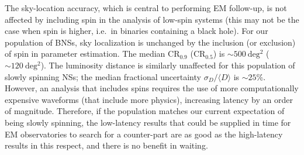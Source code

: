 The sky-location accuracy, which is central to performing EM follow-up, is not affected by including spin in the analysis of low-spin systems (this may not be the case when spin is higher, i.e.\ in binaries containing a black hole). For our population of BNSs, sky localization is unchanged by the inclusion (or exclusion) of spin in parameter estimation. The median $\mathrm{CR}_{0.9}$ ($\mathrm{CR}_{0.5}$) is $\sim 500~\mathrm{deg^2}$ ($\sim 120~\mathrm{deg^2}$). The luminosity distance is similarly unaffected for this population of slowly spinning NSs; the median fractional uncertainty $\sigma_D/\langle D \rangle$ is $\sim 25\%$.  However, an analysis that includes spins requires the use of more computationally expensive waveforms (that include more physics), increasing latency by an order of magnitude.  Therefore, if the population matches our current expectation of being slowly spinning, the low-latency results that could be supplied in time for EM observatories to search for a counter-part are as good as the high-latency results in this respect, and there is no benefit in waiting.


  
  
  
  
  
  
  
  
  
  
  